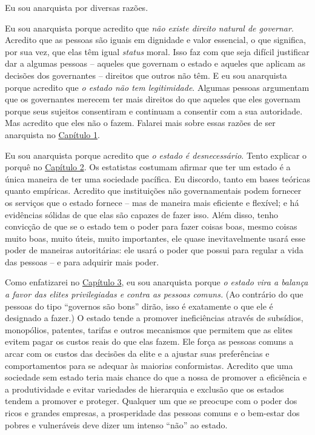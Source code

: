 Eu sou anarquista por diversas razões.

Eu sou anarquista porque acredito que \emph{não existe direito natural de governar}. Acredito que as pessoas são iguais em dignidade e valor essencial, o que significa, por sua vez, que elas têm igual \emph{status} moral. Isso faz com que seja difícil justificar dar a algumas pessoas -- aqueles que governam o estado e aqueles que aplicam as decisões dos governantes -- direitos que outros não têm. E eu sou anarquista porque acredito que \emph{o estado não tem legitimidade}. Algumas pessoas argumentam que os governantes merecem ter mais direitos do que aqueles que eles governam porque seus sujeitos consentiram e continuam a consentir com a sua autoridade. Mas acredito que eles não o fazem. Falarei mais sobre essas razões de ser anarquista no \hyperref[chap:1]{Capítulo 1}.

Eu sou anarquista porque acredito que \emph{o estado é desnecessário}. Tento explicar o porquê no \hyperref[chap:2]{Capítulo 2}. Os estatistas costumam afirmar que ter um estado é a única maneira de ter uma sociedade pacífica. Eu discordo, tanto em bases teóricas quanto empíricas. Acredito que instituições não governamentais podem fornecer os serviços que o estado fornece -- mas de maneira mais eficiente e flexível; e há evidências sólidas de que elas são capazes de fazer isso. Além disso, tenho convicção de que se o estado tem o poder para fazer coisas boas, mesmo coisas muito boas, muito úteis, muito importantes, ele quase inevitavelmente usará esse poder de maneiras autoritárias: ele usará o poder que possui para regular a vida das pessoas -- e para adquirir mais poder.

Como enfatizarei no \hyperref[chap:3]{Capítulo 3}, eu sou anarquista porque \emph{o estado vira a balança a favor das elites privilegiadas e contra as pessoas comuns.} (Ao contrário do que pessoas do tipo ``governos são bons'' dirão, isso é exatamente o que ele é designado a fazer.) O estado tende a promover ineficiências através de subsídios, monopólios, patentes, tarifas e outros mecanismos que permitem que as elites evitem pagar os custos reais do que elas fazem. Ele força as pessoas comuns a arcar com os custos das decisões da elite e a ajustar suas preferências e comportamentos para se adequar às maiorias conformistas. Acredito que uma sociedade sem estado teria mais chance do que a nossa de promover a eficiência e a produtividade e evitar variedades de hierarquia e exclusão que os estados tendem a promover e proteger. Qualquer um que se preocupe com o poder dos ricos e grandes empresas, a prosperidade das pessoas comuns e o bem-estar dos pobres e vulneráveis deve dizer um intenso ``não'' ao estado.

